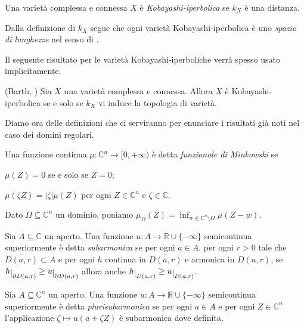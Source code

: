 \begin{defn}
    Una varietà complessa e connessa $X$ è \textit{Kobayashi-iperbolica} se $k_X$ è una distanza.
\end{defn}

\begin{oss} \label{lengthspace}
    Dalla definizione di $k_X$ segue che ogni varietà Kobayashi-iperbolica è uno \textit{spazio di lunghezze} nel senso di \cite[Part I, Definition 3.1]{BH}.
\end{oss}

Il seguente risultato per le varietà Kobayashi-iperboliche verrà spesso usato implicitamente.

\begin{prop}
    (Barth, \cite{B}) Sia $X$ una varietà complessa e connessa. Allora $X$ è Kobayashi-iperbolica se e solo se $k_X$ vi induce la topologia di varietà.
\end{prop}

Diamo ora delle definizioni che ci serviranno per enunciare i risultati già noti nel caso dei domini regolari.

\begin{defn}
    Una funzione continua $\mu:\mathbb{C}^n \longrightarrow [0,+\infty)$ è detta \textit{funzionale di Minkowski} se
    \begin{nlist}
        \item $\mu(Z)=0$ se e solo se $Z=0$;
        \item $\mu(\zeta Z)=|\zeta|\mu(Z)$ per ogni $Z \in \mathbb{C}^n$ e $\zeta\in\mathbb{C}$.
    \end{nlist}
    Dato $\Omega\subseteq\mathbb{C}^n$ un dominio, poniamo $\mu_{\Omega}(Z)=\displaystyle\inf_{w\in\mathbb{C}^n\setminus\Omega}\mu(Z-w)$.
\end{defn}

\begin{defn}
    Sia $A\subseteq\mathbb{C}$ un aperto. Una funzione $u:A \longrightarrow \mathbb{R}\cup\{-\infty\}$ semicontinua superiormente è detta \textit{subarmonica} se per ogni $a \in A$, per ogni $r>0$ tale che $\overline{D(a,r)} \subset A$ e per ogni $h$ continua in $\overline{D(a,r)}$ e armonica in $D(a,r)$, se $h\restrict{\partial D(a,r)} \ge u\restrict{\partial D(a,r)}$ allora anche $h\restrict{D(a,r)} \ge u \restrict{D(a,r)}$.

    Sia $A\subseteq\mathbb{C}^n$ un aperto. Una funzione $u:A \longrightarrow \mathbb{R}\cup\{-\infty\}$ semicontinua superiormente è detta \textit{plurisubarmonica} se per ogni $a \in A$ e per ogni $Z \in \mathbb{C}^n$ l'applicazione $\zeta \longmapsto u(a+\zeta Z)$ è subarmonica dove definita.
\end{defn}

